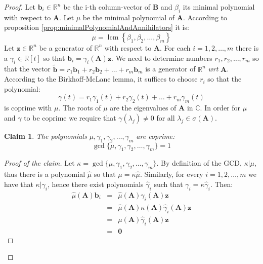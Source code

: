 \documentclass[a4paper,10pt,oneside]{book}
\newtheorem{claim}{Claim}
\begin{document}
\begin{proof}
Let $\mathbf{b}_i\in\mathbb{R}^n$ be the i-th column-vector of $\mathbf{B}$ and $\beta_i$ its minimal polynomial with respect to $\mathbf{A}$. Let $\mu$ be the minimal polynomial of $\mathbf{A}$. According to proposition \ref{prop:minimalPolynomialAndAnnihilators} it is:
 \begin{equation}
  \mu=\operatorname{lcm}\left\{\beta_1,\beta_2,\ldots,\beta_m\right\}
 \end{equation}
 Let $\mathbf{z}\in\mathbb{R}^n$ be a generator of $\mathbb{R}^n$ with respect to $\mathbf{A}$. For each $i=1,2,\ldots,m$ there is a $\gamma_i\in\mathbb{R}[t]$ so that $\mathbf{b}_i=\gamma_i(\mathbf{A})\mathbf{z}$. We need to determine numbers $r_1,r_2,\ldots,r_m$ so that the vector $\tilde{\mathbf{b}}=r_1\mathbf{b}_1+r_2\mathbf{b}_2+\ldots+r_m\mathbf{b}_m$ is a generator of $\mathbb{R}^n$ \textit{wrt} $\mathbf{A}$. According to the Birkhoff-McLane lemma, it suffices to choose $r_i$ so that the polynomial:
 \begin{equation}
  \gamma(t)=r_1\gamma_1(t)+r_2\gamma_2(t)+\ldots+r_m\gamma_m(t)
 \end{equation}
 is coprime with $\mu$. The roots of $\mu$ are the eigenvalues of $\mathbf{A}$ in $\mathbb{C}$. In order for $\mu$ and $\gamma$ to be coprime we require that $\gamma(\lambda_j)\neq 0$ for all $\lambda_j\in\sigma(\mathbf{A})$.
 \begin{claim} The polynomials $\mu,\gamma_1,\gamma_2,\ldots,\gamma_m$ are coprime:
  \begin{equation}\label{eqn:claim3}
   \operatorname{gcd}\{\mu,\gamma_1,\gamma_2,\ldots,\gamma_m\}=1
  \end{equation}
 \end{claim}
 \begin{proof}[Proof of the claim]
  Let $\kappa=\operatorname{gcd}\{\mu,\gamma_1,\gamma_2,\ldots,\gamma_m\}$. By definition of the GCD, $\kappa|\mu$, thus there is a polynomial $\hat{\mu}$ so that 
 $\mu=\kappa\hat{\mu}$. Similarly, for every $i=1,2,\ldots,m$ we have that $\kappa|\gamma_i$, hence there exist polynomials $\hat{\gamma}_i$ such that $\gamma_i=\kappa\hat{\gamma}_i$. Then:
 \begin{eqnarray}
  \hat{\mu}(\mathbf{A})\mathbf{b}_i&=&\hat{\mu}(\mathbf{A})\gamma_i(\mathbf{A})\mathbf{z}\\
&=&\hat{\mu}(\mathbf{A})\kappa(\mathbf{A})\hat{\gamma}_i(\mathbf{A})\mathbf{z}\\
&=&\mu(\mathbf{A})\hat{\gamma}_i(\mathbf{A})\mathbf{z}\\
&=&\mathbf{0}
 \end{eqnarray}

\end{proof}
\end{proof}
\end{document}
